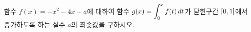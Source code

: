 함수 $f(x)=-x^2-4x+a$에 대하여 함수 $g(x)=\displaystyle\int_{0}^{x}f(t)\mkern3mu dt$가 닫힌구간 $[0{,}\mkern3mu\mathopen{}1]$에서 증가하도록 하는 실수 $a$의 최솟값을 구하시오.
